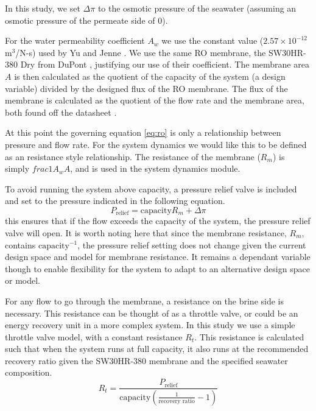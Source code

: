\documentclass[twocolumn,10pt]{asme2e}
\begin{document}
In this study, we set $\Delta \pi$ to the osmotic pressure of the seawater (assuming an osmotic pressure of the permeate side of 0).

For the water permeability coefficient $A_w$ we use the constant value ($2.57\times10^{-12}$ m$^3$/N-s) used by Yu and Jenne \cite{Yu2018}. We use the same RO membrane, the SW30HR-380 Dry from DuPont \cite{SW30HR380}, justifying our use of their coefficient. The membrane area $A$ is then calculated as the quotient of the capacity of the system (a design variable) divided by the designed flux of the RO membrane. The flux of the membrane is calculated as the quotient of the flow rate and the membrane area, both found off the datasheet \cite{SW30HR380}.

At this point the governing equation \ref{eq:ro} is only a relationship between pressure and flow rate. For the system dynamics we would like this to be defined as an resistance style relationship. The resistance of the membrane ($R_m$) is simply $frac{1}{A_w A}$, and is used in the system dynamics module.

To avoid running the system above capacity, a pressure relief valve is included and set to the pressure indicated in the following equation.
\begin{equation}
    P_{\text{relief}} = \text{capacity}R_m + \Delta \pi
    \label{eq:pressure_relief}
\end{equation}
this ensures that if the flow exceeds the capacity of the system, the pressure relief valve will open. It is worth noting here that since the membrane resistance, $R_m$, contains $\text{capacity}^{-1}$, the pressure relief setting does not change given the current design space and model for membrane resistance. It remains a dependant variable though to enable flexibility for the system to adapt to an alternative design space or model.

For any flow to go through the membrane, a resistance on the brine side is necessary. This resistance can be thought of as a throttle valve, or could be an energy recovery unit in a more complex system. In this study we use a simple throttle valve model, with a constant resistance $R_t$. This resistance is calculated such that when the system runs at full capacity, it also runs at the recommended recovery ratio given the SW30HR-380 membrane and the specified seawater composition.
\begin{equation}
    R_t = \frac{P_{\text{relief}}}{\text{capacity}(\frac{1}{\text{recovery ratio}} - 1)}
\end{equation}
\end{document}
